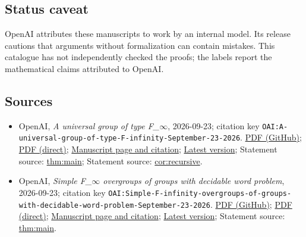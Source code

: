 \documentclass[11pt]{article}
\begin{document}
\subsection{Status caveat}
OpenAI attributes these manuscripts to work by an internal model. Its release cautions that arguments without formalization can contain mistakes. This catalogue has not independently checked the proofs; the labels report the mathematical claims attributed to OpenAI.

\subsection{Sources}
\begin{itemize}
\item OpenAI, \emph{A universal group of type F\_\(\infty\)}, 2026-09-23; citation key \texttt{OAI:A-universal-group-of-type-F-infinity-September-23-2026}. \href{https://github.com/openai/math/blob/adc7f1241b42e322a6451854ab7e4b4c146bf78a/preprints/A-universal-group-of-type-F-infinity-September-23-2026/paper.pdf}{PDF (GitHub)}; \href{https://github.com/openai/math/raw/adc7f1241b42e322a6451854ab7e4b4c146bf78a/preprints/A-universal-group-of-type-F-infinity-September-23-2026/paper.pdf}{PDF (direct)}; \href{https://github.com/openai/math/blob/adc7f1241b42e322a6451854ab7e4b4c146bf78a/preprints/A-universal-group-of-type-F-infinity-September-23-2026/README.md}{Manuscript page and citation}; \href{https://github.com/openai/math/blob/main/preprints/A-universal-group-of-type-F-infinity-September-23-2026/paper.pdf}{Latest version}; Statement source: \href{https://github.com/openai/math/blob/adc7f1241b42e322a6451854ab7e4b4c146bf78a/preprints/A-universal-group-of-type-F-infinity-September-23-2026/build/sections/introduction.tex\#L10}{thm:main}; Statement source: \href{https://github.com/openai/math/blob/adc7f1241b42e322a6451854ab7e4b4c146bf78a/preprints/A-universal-group-of-type-F-infinity-September-23-2026/build/sections/introduction.tex\#L20}{cor:recursive}.
\item OpenAI, \emph{Simple F\_\(\infty\) overgroups of groups with decidable word problem}, 2026-09-23; citation key \texttt{OAI:Simple-F-infinity-overgroups-of-groups-with-decidable-word-problem-September-23-2026}. \href{https://github.com/openai/math/blob/adc7f1241b42e322a6451854ab7e4b4c146bf78a/preprints/Simple-F-infinity-overgroups-of-groups-with-decidable-word-problem-September-23-2026/paper.pdf}{PDF (GitHub)}; \href{https://github.com/openai/math/raw/adc7f1241b42e322a6451854ab7e4b4c146bf78a/preprints/Simple-F-infinity-overgroups-of-groups-with-decidable-word-problem-September-23-2026/paper.pdf}{PDF (direct)}; \href{https://github.com/openai/math/blob/adc7f1241b42e322a6451854ab7e4b4c146bf78a/preprints/Simple-F-infinity-overgroups-of-groups-with-decidable-word-problem-September-23-2026/README.md}{Manuscript page and citation}; \href{https://github.com/openai/math/blob/main/preprints/Simple-F-infinity-overgroups-of-groups-with-decidable-word-problem-September-23-2026/paper.pdf}{Latest version}; Statement source: \href{https://github.com/openai/math/blob/adc7f1241b42e322a6451854ab7e4b4c146bf78a/preprints/Simple-F-infinity-overgroups-of-groups-with-decidable-word-problem-September-23-2026/build/sections/introduction.tex\#L33}{thm:main}.

\end{itemize}
\end{document}
